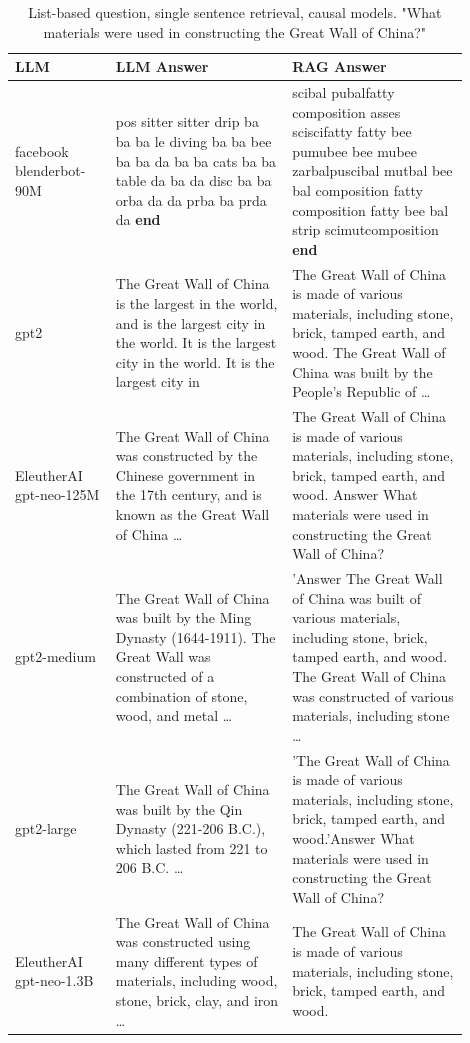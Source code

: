 \documentclass{wseas}
\begin{document}
\begin{table}[htbp]
  \centering
  \caption{List-based question, single sentence retrieval, causal models. "What materials were used in constructing the Great Wall of China?"}
  \label{tab:experiment_Q_listBased_R_1Sentence_Q_listBased_M_causalModel_table}  
  \begin{tabular}{|p{0.20\linewidth}|p{0.35\linewidth}|p{0.35\linewidth}|}
    \hline
    \textbf{LLM} & \textbf{LLM Answer} & \textbf{RAG Answer} \\ \hline
    facebook blenderbot-90M & pos sitter sitter drip ba ba ba le diving ba ba bee ba ba da ba ba cats ba ba table da ba da disc ba ba orba da da prba ba prda da \textbf{end} & scibal pubalfatty composition asses sciscifatty fatty bee pumubee bee mubee zarbalpuscibal mutbal bee bal composition fatty composition fatty bee bal strip scimutcomposition \textbf{end} \\ \hline
    gpt2 & The Great Wall of China is the largest in the world, and is the largest city in the world. It is the largest city in the world. It is the largest city in & The Great Wall of China is made of various materials, including stone, brick, tamped earth, and wood. The Great Wall of China was built by the People's Republic of \ldots{} \\ \hline
    EleutherAI gpt-neo-125M & The Great Wall of China was constructed by the Chinese government in the 17th century, and is known as the Great Wall of China \ldots{} & The Great Wall of China is made of various materials, including stone, brick, tamped earth, and wood. Answer What materials were used in constructing the Great Wall of China? \\ \hline
    gpt2-medium & The Great Wall of China was built by the Ming Dynasty (1644-1911). The Great Wall was constructed of a combination of stone, wood, and metal \ldots{} & 'Answer The Great Wall of China was built of various materials, including stone, brick, tamped earth, and wood. The Great Wall of China was constructed of various materials, including stone \ldots{} \\ \hline
    gpt2-large & The Great Wall of China was built by the Qin Dynasty (221-206 B.C.), which lasted from 221 to 206 B.C. \ldots{} & 'The Great Wall of China is made of various materials, including stone, brick, tamped earth, and wood.'Answer What materials were used in constructing the Great Wall of China? \\ \hline
    EleutherAI gpt-neo-1.3B & The Great Wall of China was constructed using many different types of materials, including wood, stone, brick, clay, and iron \ldots{} & The Great Wall of China is made of various materials, including stone, brick, tamped earth, and wood. \\ \hline
  \end{tabular}
\end{table}
\end{document}
